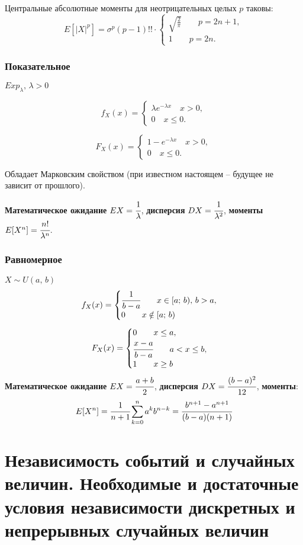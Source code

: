 \documentclass{article}
\begin{document}
Центральные абсолютные моменты для неотрицательных целых $p$ таковы:
$$ E[|X|^p]=\sigma^p(p-1)!!\cdot\begin{cases}\sqrt{\frac{2}{\pi}} \quad\quad p=2n+1,\\1\quad\quad p=2n.\end{cases} $$
\subsubsection{Показательное}
$Exp_{\lambda},\,\lambda>0$

$$f_X(x)=\begin{cases}\lambda e^{-\lambda x}\quad x>0,\\0\quad x\leq 0.\end{cases}$$

$$F_X(x)=\begin{cases}1- e^{-\lambda x}\quad x>0,\\0\quad x\leq 0.\end{cases}$$

Обладает Марковским свойством (при известном настоящем -- будущее не зависит от прошлого).

\textbf{Математическое ожидание} $EX=\cfrac{1}{\lambda}$, \textbf{дисперсия} $DX=\cfrac{1}{\lambda^2}$, \textbf{моменты} $E[X^n]=\cfrac{n!}{\lambda^n}$.

\subsubsection{Равномерное}
$X\sim U(a,\,b)$
$$ f_X(x)=\begin{cases}
\cfrac{1}{b-a}\quad\quad x\in [a;\,b),\,b>a,\\
0\quad\quad x\notin[a;\,b)
\end{cases}$$
$$ F_X(x)=\begin{cases}
0 \quad\quad x\leq a,\\
\cfrac{x-a}{b-a}\quad\quad a<x\leq b,\\
1\quad\quad x\geq b
\end{cases} $$
\textbf{Математическое ожидание} $EX=\cfrac{a+b}{2}$, \textbf{дисперсия} $DX=\cfrac{(b-a)^2}{12}$, \textbf{моменты}:
$$ E[X^n]=\cfrac{1}{n+1}\sum_{k=0}^n a^k b^{n-k}=\cfrac{b^{n+1}-a^{n+1}}{(b-a)(n+1)} $$
\newpage
\section{Независимость событий и случайных величин. Необходимые и достаточные условия независимости дискретных и непрерывных случайных величин}
\end{document}
